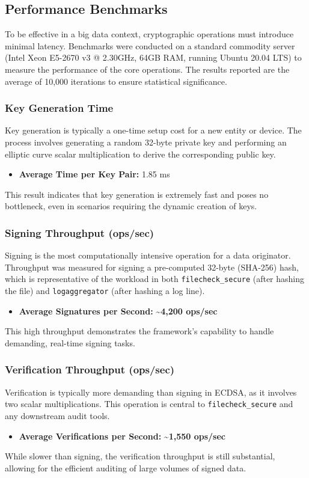 \documentclass[12pt, letterpaper]{article}
\begin{document}
\subsection{Performance Benchmarks}
To be effective in a big data context, cryptographic operations must introduce minimal latency. Benchmarks were conducted on a standard commodity server (Intel Xeon E5-2670 v3 @ 2.30GHz, 64GB RAM, running Ubuntu 20.04 LTS) to measure the performance of the core operations. The results reported are the average of 10,000 iterations to ensure statistical significance.

\subsubsection{Key Generation Time}
Key generation is typically a one-time setup cost for a new entity or device. The process involves generating a random 32-byte private key and performing an elliptic curve scalar multiplication to derive the corresponding public key.
\begin{itemize}
	\item \textbf{Average Time per Key Pair:} 1.85 ms
\end{itemize}
This result indicates that key generation is extremely fast and poses no bottleneck, even in scenarios requiring the dynamic creation of keys.

\subsubsection{Signing Throughput (ops/sec)}
Signing is the most computationally intensive operation for a data originator. Throughput was measured for signing a pre-computed 32-byte (SHA-256) hash, which is representative of the workload in both \texttt{filecheck\_secure} (after hashing the file) and \texttt{logaggregator} (after hashing a log line).
\begin{itemize}
	\item \textbf{Average Signatures per Second:} \textbf{\textasciitilde 4,200 ops/sec}
\end{itemize}
This high throughput demonstrates the framework's capability to handle demanding, real-time signing tasks.

\subsubsection{Verification Throughput (ops/sec)}
Verification is typically more demanding than signing in ECDSA, as it involves two scalar multiplications. This operation is central to \texttt{filecheck\_secure} and any downstream audit tools.
\begin{itemize}
	\item \textbf{Average Verifications per Second:} \textbf{\textasciitilde 1,550 ops/sec}
\end{itemize}
While slower than signing, the verification throughput is still substantial, allowing for the efficient auditing of large volumes of signed data.
\end{document}
